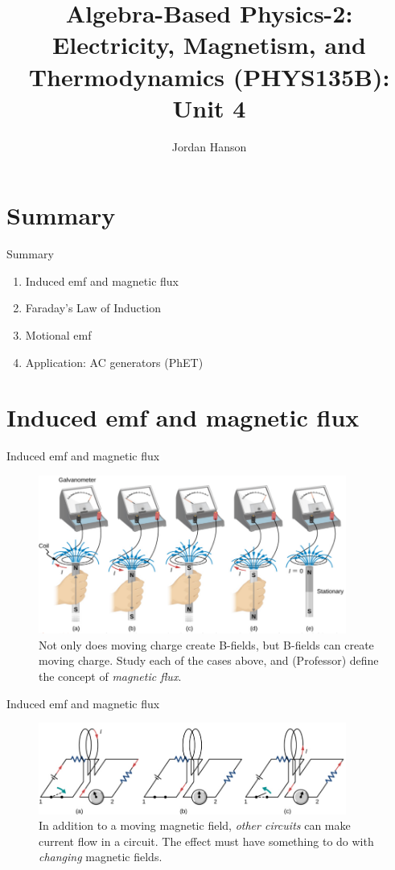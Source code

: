 \documentclass{beamer}
\title{Algebra-Based Physics-2: Electricity, Magnetism, and Thermodynamics (PHYS135B): Unit 4}
\author{Jordan Hanson}
\institute{Whittier College Department of Physics and Astronomy}
\begin{document}
\maketitle

\section{Summary}

\begin{frame}{Summary}
\begin{enumerate}
\item Induced emf and magnetic flux
\item Faraday's Law of Induction
\item Motional emf
\item Application: AC generators (PhET)
\end{enumerate}
\end{frame}

\section{Induced emf and magnetic flux}

\begin{frame}{Induced emf and magnetic flux}
\begin{figure}
\centering
\includegraphics[width=0.9\textwidth]{figures/farad.png}
\caption{\label{fig:farad1} Not only does moving charge create B-fields, but B-fields can create moving charge.  Study each of the cases above, and (Professor) define the concept of \textit{magnetic flux}.}
\end{figure}
\end{frame}

\begin{frame}{Induced emf and magnetic flux}
\begin{figure}
\centering
\includegraphics[width=0.9\textwidth]{figures/farad2.png}
\caption{\label{fig:farad2} In addition to a moving magnetic field, \textit{other circuits} can make current flow in a circuit.  The effect must have something to do with \textit{changing} magnetic fields.}
\end{figure}
\end{frame}
\end{document}
